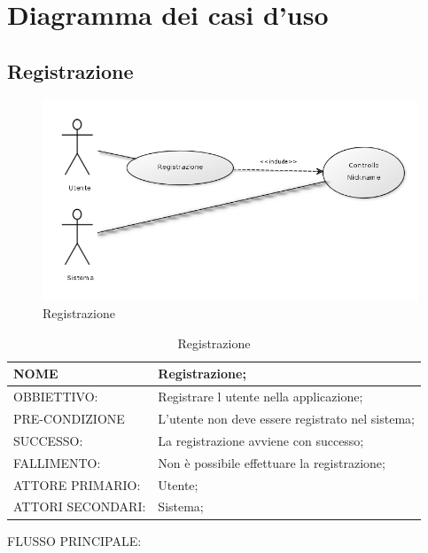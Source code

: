 \chapter{Diagramma dei casi d'uso}

\section{Registrazione}
\begin{figure}[h!]
\centering
\includegraphics[scale=0.55]{img/registrazione.png}
\caption{Registrazione}
\label{fig:registrazione}
\end{figure}
\begin{table}[H]
\begin{tabular}{p{}|p{}}
\toprule
NOME & Registrazione;\\
\hline
OBBIETTIVO: & Registrare l utente nella applicazione;\\
\hline
PRE-CONDIZIONE & L'utente non deve essere registrato nel sistema;\\
\hline
SUCCESSO: & La registrazione avviene con successo;\\
\hline
FALLIMENTO: & Non è possibile effettuare la registrazione; \\
\hline
ATTORE PRIMARIO: & Utente;\\
\hline
ATTORI SECONDARI: & Sistema;\\
\bottomrule
\end{tabular}
\caption{Registrazione}
\label{table:reg}
\end{table}
FLUSSO PRINCIPALE:
